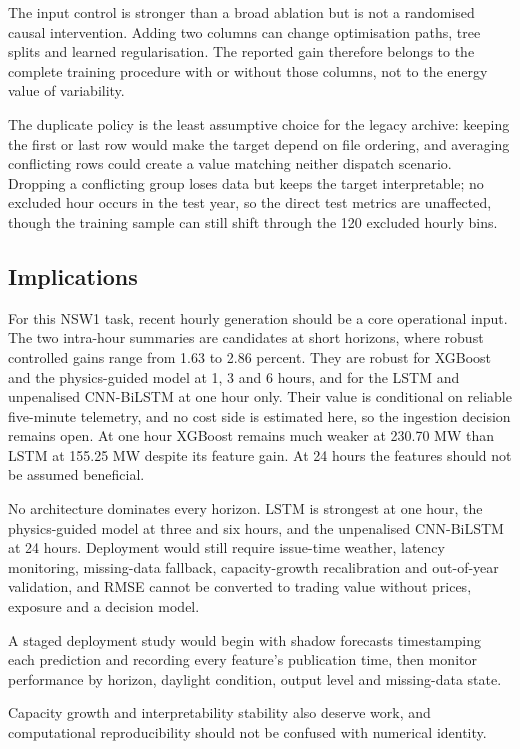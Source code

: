 The input control is stronger than a broad ablation but is not a randomised causal intervention. Adding two columns can change optimisation paths, tree splits and learned regularisation. The reported gain therefore belongs to the complete training procedure with or without those columns, not to the energy value of variability.

The duplicate policy is the least assumptive choice for the legacy archive: keeping the first or last row would make the target depend on file ordering, and averaging conflicting rows could create a value matching neither dispatch scenario. Dropping a conflicting group loses data but keeps the target interpretable; no excluded hour occurs in the test year, so the direct test metrics are unaffected, though the training sample can still shift through the 120 excluded hourly bins.

\subsection{Implications}

For this NSW1 task, recent hourly generation should be a core operational input. The two intra-hour summaries are candidates at short horizons, where robust controlled gains range from 1.63 to 2.86 percent. They are robust for XGBoost and the physics-guided model at 1, 3 and 6 hours, and for the LSTM and unpenalised CNN-\allowbreak{}BiLSTM at one hour only. Their value is conditional on reliable five-minute telemetry, and no cost side is estimated here, so the ingestion decision remains open. At one hour XGBoost remains much weaker at 230.70 MW than LSTM at 155.25 MW despite its feature gain. At 24 hours the features should not be assumed beneficial.

No architecture dominates every horizon. LSTM is strongest at one hour, the physics-guided model at three and six hours, and the unpenalised CNN-\allowbreak{}BiLSTM at 24 hours. Deployment would still require issue-time weather, latency monitoring, missing-data fallback, capacity-growth recalibration and out-of-year validation, and RMSE cannot be converted to trading value without prices, exposure and a decision model.

A staged deployment study would begin with shadow forecasts timestamping each prediction and recording every feature's publication time, then monitor performance by horizon, daylight condition, output level and missing-data state.

Capacity growth and interpretability stability also deserve work, and computational reproducibility should not be confused with numerical identity.
